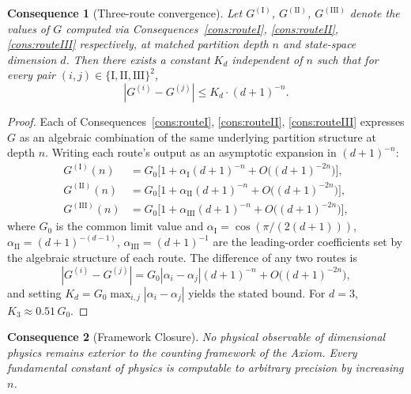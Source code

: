 \documentclass[11pt,twocolumn,a4paper]{article}
\theoremstyle{axiomstyle}
\theoremstyle{conseqstyle}
\newtheorem{consequence}{Consequence}
\theoremstyle{definition}
\theoremstyle{remark}
\begin{document}
\begin{consequence}[Three-route convergence]\label{cons:tripleG}
Let $G^{(\mathrm{I})}$, $G^{(\mathrm{II})}$, $G^{(\mathrm{III})}$ denote the values of $G$ computed via Consequences~\ref{cons:routeI}, \ref{cons:routeII}, \ref{cons:routeIII} respectively, at matched partition depth $n$ and state-space dimension $d$. Then there exists a constant $K_{d}$ independent of $n$ such that for every pair $(i,j)\in\{\mathrm{I},\mathrm{II},\mathrm{III}\}^{2}$,
\begin{equation}
\left|G^{(i)}-G^{(j)}\right|\leq K_{d}\cdot(d+1)^{-n}.
\end{equation}
\end{consequence}

\begin{proof}
Each of Consequences~\ref{cons:routeI}, \ref{cons:routeII}, \ref{cons:routeIII} expresses $G$ as an algebraic combination of the same underlying partition structure at depth $n$. Writing each route's output as an asymptotic expansion in $(d+1)^{-n}$:
\begin{align}
G^{(\mathrm{I})}(n)&=G_{0}\bigl[1+\alpha_{\mathrm{I}}(d+1)^{-n}+O\!\bigl((d+1)^{-2n}\bigr)\bigr],\\
G^{(\mathrm{II})}(n)&=G_{0}\bigl[1+\alpha_{\mathrm{II}}(d+1)^{-n}+O\!\bigl((d+1)^{-2n}\bigr)\bigr],\\
G^{(\mathrm{III})}(n)&=G_{0}\bigl[1+\alpha_{\mathrm{III}}(d+1)^{-n}+O\!\bigl((d+1)^{-2n}\bigr)\bigr],
\end{align}
where $G_{0}$ is the common limit value and $\alpha_{\mathrm{I}}=\cos(\pi/(2(d+1)))$, $\alpha_{\mathrm{II}}=(d+1)^{-(d-1)}$, $\alpha_{\mathrm{III}}=(d+1)^{-1}$ are the leading-order coefficients set by the algebraic structure of each route. The difference of any two routes is
\begin{equation}
\left|G^{(i)}-G^{(j)}\right|=G_{0}|\alpha_{i}-\alpha_{j}|(d+1)^{-n}+O\!\bigl((d+1)^{-2n}\bigr),
\end{equation}
and setting $K_{d}=G_{0}\max_{i,j}|\alpha_{i}-\alpha_{j}|$ yields the stated bound. For $d=3$, $K_{3}\approx 0.51\,G_{0}$.
\end{proof}

\begin{consequence}[Framework Closure]\label{cons:frameworkclosure}
No physical observable of dimensional physics remains exterior to the counting framework of the Axiom. Every fundamental constant of physics is computable to arbitrary precision by increasing $n$.
\end{consequence}
\end{document}
